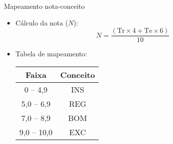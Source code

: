 \documentclass[
size=17pt,
paper=smartboard,
mode=present,
display=slidesnotes,
style=sailor,
nopagebreaks,
blackslide,
fleqn]{powerdot}
\begin{document}
      \begin{slide}[toc=]{Mapeamento nota-conceito}
         \begin{itemize}
            \item Cálculo da nota ($N$): 
            \begin{equation*}
               N=\frac{( \text{Tr} \times 4 + \text{Te} \times 6 )} {10}
            \end{equation*}
            \item Tabela de mapeamento:
            \begin{table}
               \centering
               \begin{tabular}{c|c}
                  \hline\hline
                  \textbf{Faixa} & \textbf{Conceito}\\
                  \hline
                  0 -- 4,9 & INS\\
                  5,0 -- 6,9 & REG\\
                  7,0 -- 8,9 & BOM\\
                  9,0 -- 10,0 & EXC\\
                  \hline\hline
               \end{tabular}
            \end{table}    
         \end{itemize}
      \end{slide}
      
\end{document}
